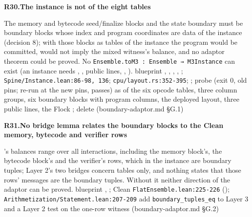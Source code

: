 \par\medskip\noindent\textbf{R30.}\enspace\textbf{The instance is not  of the eight tables}\par\nopagebreak
{} The memory and bytecode seed/finalize blocks and the state boundary must be boundary blocks whose index and program coordinates are  data of the instance (decision 8); with those blocks as tables of the instance the program would be committed,  would not imply the mixed witness's balance, and no adaptor theorem could be proved. No \texttt{Ensemble.\allowbreak{}to\allowbreak{}M3 :\allowbreak{} Ensemble → M3Instance} can exist (an instance needs , , public lines, , ).
 blueprint , , , , ; \texttt{Spine/\allowbreak{}Instance.\allowbreak{}lean:\allowbreak{}86-\allowbreak{}98,\allowbreak{} 136}; \texttt{cpu/\allowbreak{}layout.\allowbreak{}rs:\allowbreak{}352-\allowbreak{}395}; ; probe  (exit 0, old pins;  re-run at the new pins, passes)
  as  of the six opcode tables, three column groups, six boundary blocks with  program columns, the deployed layout, three public lines, the Flock ; delete  (boundary-adaptor.md §G.1)

\par\medskip\noindent\textbf{R31.}\enspace\textbf{No bridge lemma relates the boundary blocks to the Clean memory, bytecode and verifier rows}\par\nopagebreak
{} 's balances range over all interactions, including the memory block's, the bytecode block's and the verifier's rows, which in the instance are boundary tuples; Layer 2's two bridges concern tables only, and nothing states that those rows' messages are the boundary tuples. Without it neither direction of the adaptor can be proved.
 blueprint , ; Clean \texttt{Flat\allowbreak{}Ensemble.\allowbreak{}lean:\allowbreak{}225-\allowbreak{}226} (); \texttt{Arithmetization/\allowbreak{}Statement.\allowbreak{}lean:\allowbreak{}207-\allowbreak{}209}
 add \texttt{boundary\_\allowbreak{}tuples\_\allowbreak{}eq} to Layer 3 and a Layer 2 test on the one-row witness (boundary-adaptor.md §G.2)

